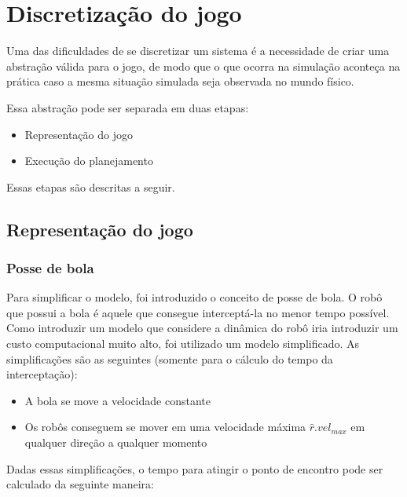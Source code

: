 \section{Discretização do jogo}\label{sec:mapeamento}

Uma das dificuldades de se discretizar um sistema é a necessidade de criar uma
abstração válida para o jogo, de modo que o que ocorra na simulação aconteça na
prática caso a mesma situação simulada seja observada no mundo físico.

Essa abstração pode ser separada em duas etapas:

\begin{itemize}
  \item Representação do jogo
  \item Execução do planejamento
\end{itemize}

Essas etapas são descritas a seguir.

\subsection{Representação do jogo}\label{subsec:repres_jogo}

\subsubsection{Posse de bola}

Para simplificar o modelo, foi introduzido o conceito de posse de bola. O robô
que possui a bola é aquele que consegue interceptá-la no menor tempo possível.
Como introduzir um modelo que considere a dinâmica do robô iria introduzir um
custo computacional muito alto, foi utilizado um modelo simplificado. As
simplificações são as seguintes (somente para o cálculo do tempo da
interceptação):

\begin{itemize}
  \item A bola se move a velocidade constante
  \item Os robôs conseguem se mover em uma velocidade máxima
        $\hat{r}.vel_{max}$ em qualquer direção a qualquer momento
\end{itemize}

Dadas essas simplificações, o tempo para atingir o ponto de encontro pode ser
calculado da seguinte maneira:


